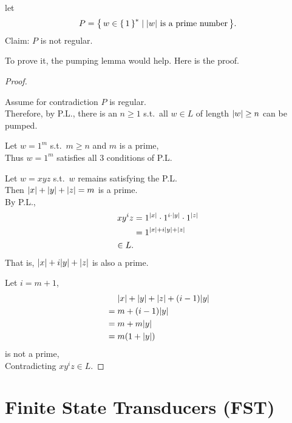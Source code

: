 

\begin{example}[]
    let
    \[
        P = { \left\{\, w \in { \left\{\,1\,\right\} }^* \mid \text{${ \left\lvert w \right\rvert }$ is a prime number} \,\right\} }.
    \]
    Claim: $P$ is not regular.

    To prove it, the pumping lemma would help. Here is the proof.
    \begin{proof}\ 

        Assume for contradiction $P$ is regular. \\
        Therefore, by P.L.,
        there is an $n \ge 1$ s.t.\
        all $w \in L$ of length ${ \left\lvert w \right\rvert } \ge n$ can be pumped.

        Let $w = 1^m$ s.t.\ $m \ge n$ and $m$ is a prime, \\
        Thus $w = 1^m$ satisfies all 3 conditions of P.L.

        Let
        $w = xyz$ s.t.\ $w$ remains satisfying the P.L. \\
        Then ${ \left\lvert x \right\rvert } + { \left\lvert y \right\rvert } + { \left\lvert z \right\rvert } = m$ is a prime. \\
        By P.L.,
        \begin{align*}
            x y^i z
            &= 1^{{ \left\lvert x \right\rvert }} \cdot 1^{i \cdot { \left\lvert y \right\rvert }} \cdot 1^{{ \left\lvert z \right\rvert }}  \\
            &= 1^{{ \left\lvert x \right\rvert } + i { \left\lvert y \right\rvert } + { \left\lvert z \right\rvert }}  \\
            \in L
        .\end{align*}
        That is,
        ${{ \left\lvert x \right\rvert } + i { \left\lvert y \right\rvert } + { \left\lvert z \right\rvert }}$
        is also a prime.

        Let
        $i = m+1$,
        \begin{align*}
            &\phteq \abs x + \abs y + \abs z + (i-1)\abs y  \\
            &=      m + (i-1)\abs y  \\
            &=      m + m\abs y  \\
            &=      m(1+\abs y)
            \end{align*}
        is not a prime, \\
        Contradicting
        $xy^iz \in L$.
    \end{proof}

\end{example}

\section{Finite State Transducers (FST)}

